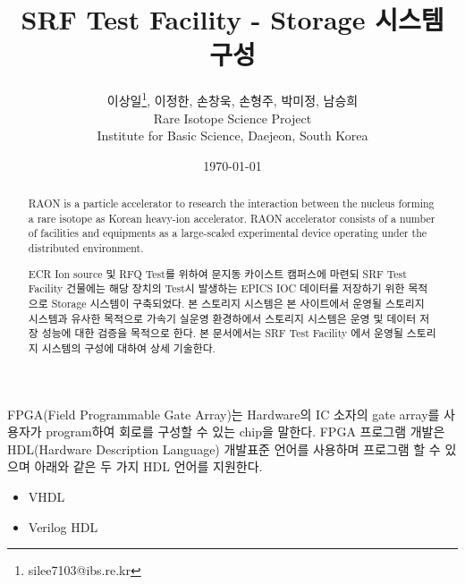 \documentclass[11pt
  , a4paper
  , article
  , oneside
]{memoir}
\begin{document}
\newcommand{\technumber}{
  RAON Control-Document Series\\
  Revision : v1.0,   Release : 2015-03-16 fixed date}
\title{\textbf{SRF Test Facility - Storage 시스템 구성}}

\author{이상일\thanks{silee7103@ibs.re.kr}, 이정한, 손창욱, 손형주, 박미정, 남승희 \\

  Rare Isotope Science Project\\
  Institute for Basic Science, Daejeon, South Korea
}
\date{\today}

\renewcommand{\maketitlehooka}{\begin{flushright}\textsf{\technumber}\end{flushright}}

\maketitle

\begin{abstract}
RAON is a particle accelerator to research the interaction between the nucleus forming a rare isotope as Korean heavy-ion accelerator. RAON accelerator consists of a number of facilities and equipments as a large-scaled experimental device operating under the distributed environment. 

ECR Ion source 및 RFQ Test를 위하여 문지동 카이스트 캠퍼스에 마련되 SRF Test Facility 건물에는 해당 장치의 Test시 발생하는 EPICS IOC 데이터를 저장하기 위한 목적으로 Storage 시스템이 구축되었다. 본 스토리지 시스템은 본 사이트에서 운영될 스토리지 시스템과 유사한 목적으로 가속기 실운영 환경하에서 스토리지 시스템은 운영 및 데이터 저장 성능에 대한 검증을 목적으로 한다. 본 문서에서는 SRF Test Facility 에서 운영될 스토리지 시스템의 구성에 대하여 상세 기술한다.

\end{abstract}

FPGA(Field Programmable Gate Array)는 Hardware의 IC 소자의 gate array를 사용자가 program하여 회로를 구성할 수 있는 chip을 말한다. FPGA 프로그램 개발은 HDL(Hardware Description Language) 개발표준 언어를 사용하며 프로그램 할 수 있으며 아래와 같은 두 가지 HDL 언어를 지원한다.

\begin{itemize}
	\item VHDL
	\item Verilog HDL
\end{itemize}
\end{document}

